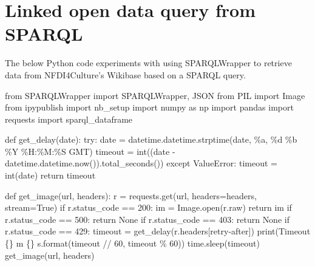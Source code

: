 \documentclass[
  letterpaper,
  DIV=11,
  numbers=noendperiod]{scrreprt}
\newenvironment{Shaded}{\begin{snugshade}}{\end{snugshade}}
\newcommand{\BuiltInTok}[1]{\textcolor[rgb]{0.00,0.23,0.31}{#1}}
\newcommand{\ControlFlowTok}[1]{\textcolor[rgb]{0.00,0.23,0.31}{#1}}
\newcommand{\DecValTok}[1]{\textcolor[rgb]{0.68,0.00,0.00}{#1}}
\newcommand{\ImportTok}[1]{\textcolor[rgb]{0.00,0.46,0.62}{#1}}
\newcommand{\KeywordTok}[1]{\textcolor[rgb]{0.00,0.23,0.31}{#1}}
\newcommand{\NormalTok}[1]{\textcolor[rgb]{0.00,0.23,0.31}{#1}}
\newcommand{\OperatorTok}[1]{\textcolor[rgb]{0.37,0.37,0.37}{#1}}
\newcommand{\PreprocessorTok}[1]{\textcolor[rgb]{0.68,0.00,0.00}{#1}}
\newcommand{\SpecialCharTok}[1]{\textcolor[rgb]{0.37,0.37,0.37}{#1}}
\newcommand{\StringTok}[1]{\textcolor[rgb]{0.13,0.47,0.30}{#1}}
\newcommand{\VariableTok}[1]{\textcolor[rgb]{0.07,0.07,0.07}{#1}}
\begin{document}

\hypertarget{linked-open-data-query-from-sparql}{%
\chapter{Linked open data query from
SPARQL}\label{linked-open-data-query-from-sparql}}

The below Python code experiments with using SPARQLWrapper to retrieve
data from NFDI4Culture's Wikibase based on a SPARQL query.

\begin{Shaded}
\begin{Highlighting}[]
\ImportTok{from}\NormalTok{ SPARQLWrapper }\ImportTok{import}\NormalTok{ SPARQLWrapper, JSON}
\ImportTok{from}\NormalTok{ PIL }\ImportTok{import}\NormalTok{ Image}
\ImportTok{from}\NormalTok{ ipypublish }\ImportTok{import}\NormalTok{ nb\_setup}
\ImportTok{import}\NormalTok{ numpy }\ImportTok{as}\NormalTok{ np}
\ImportTok{import}\NormalTok{ pandas}
\ImportTok{import}\NormalTok{ requests}
\ImportTok{import}\NormalTok{ sparql\_dataframe}

\KeywordTok{def}\NormalTok{ get\_delay(date):}
    \ControlFlowTok{try}\NormalTok{:}
\NormalTok{        date }\OperatorTok{=}\NormalTok{ datetime.datetime.strptime(date, }\StringTok{\textquotesingle{}\%a, }\SpecialCharTok{\%d}\StringTok{ \%b \%Y \%H:\%M:\%S GMT\textquotesingle{}}\NormalTok{)}
\NormalTok{        timeout }\OperatorTok{=} \BuiltInTok{int}\NormalTok{((date }\OperatorTok{{-}}\NormalTok{ datetime.datetime.now()).total\_seconds())}
    \ControlFlowTok{except} \PreprocessorTok{ValueError}\NormalTok{:}
\NormalTok{        timeout }\OperatorTok{=} \BuiltInTok{int}\NormalTok{(date)}
    \ControlFlowTok{return}\NormalTok{ timeout}

\KeywordTok{def}\NormalTok{ get\_image(url, headers):}
\NormalTok{    r }\OperatorTok{=}\NormalTok{ requests.get(url, headers}\OperatorTok{=}\NormalTok{headers, stream}\OperatorTok{=}\VariableTok{True}\NormalTok{)}
    \ControlFlowTok{if}\NormalTok{ r.status\_code }\OperatorTok{==} \DecValTok{200}\NormalTok{:}
\NormalTok{        im }\OperatorTok{=}\NormalTok{ Image.}\BuiltInTok{open}\NormalTok{(r.raw)}
        \ControlFlowTok{return}\NormalTok{ im}
    \ControlFlowTok{if}\NormalTok{ r.status\_code }\OperatorTok{==} \DecValTok{500}\NormalTok{:}
        \ControlFlowTok{return} \VariableTok{None}
    \ControlFlowTok{if}\NormalTok{ r.status\_code }\OperatorTok{==} \DecValTok{403}\NormalTok{:}
        \ControlFlowTok{return} \VariableTok{None}
    \ControlFlowTok{if}\NormalTok{ r.status\_code }\OperatorTok{==} \DecValTok{429}\NormalTok{:}
\NormalTok{        timeout }\OperatorTok{=}\NormalTok{ get\_delay(r.headers[}\StringTok{\textquotesingle{}retry{-}after\textquotesingle{}}\NormalTok{])}
        \BuiltInTok{print}\NormalTok{(}\StringTok{\textquotesingle{}Timeout }\SpecialCharTok{\{\}}\StringTok{ m }\SpecialCharTok{\{\}}\StringTok{ s\textquotesingle{}}\NormalTok{.}\BuiltInTok{format}\NormalTok{(timeout }\OperatorTok{//} \DecValTok{60}\NormalTok{, timeout }\OperatorTok{\%} \DecValTok{60}\NormalTok{))}
\NormalTok{        time.sleep(timeout)}
\NormalTok{        get\_image(url, headers)}


\end{Highlighting}
\end{Shaded}
\end{document}
